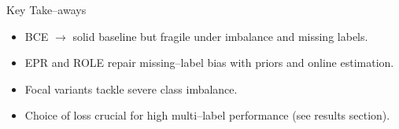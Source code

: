 
\begin{frame}{Key Take--aways}
\begin{itemize}
  \item BCE $\rightarrow{}$ solid baseline but fragile under imbalance and missing labels.
  \item EPR and ROLE repair missing--label bias with priors and online estimation.
  \item Focal variants tackle severe class imbalance.
  \item Choice of loss crucial for high multi--label performance (see results section).
\end{itemize}
\end{frame}





